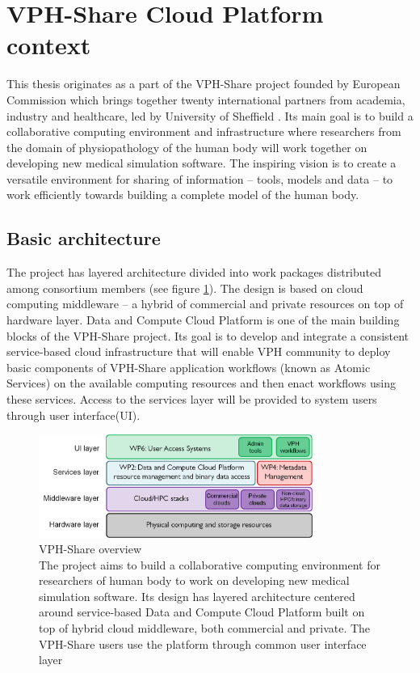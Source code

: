\section{VPH-Share Cloud Platform context}
This thesis originates as a part of the VPH-Share project founded by European Commission
which brings together twenty international partners from academia, industry and healthcare,
led by University of Sheffield \cite{vph-share-website}. Its main goal is to build a collaborative computing
environment and infrastructure where researchers from the domain of physiopathology of
the human body will work together on developing new medical simulation software. The inspiring
vision is to create a versatile environment for sharing of information -- tools, models and data
-- to work efficiently towards building a complete model of the human body.\\

\subsection{Basic architecture}
The project has layered architecture divided into work packages distributed among consortium
members (see figure \ref{fig:dri-high-level}). The design is based on cloud computing middleware
-- a hybrid of commercial and private resources on top of hardware layer. Data and Compute
Cloud Platform is one of the main building blocks of the VPH-Share project. Its goal is to
develop and integrate a consistent service-based cloud infrastructure that will enable VPH
community to deploy basic components of VPH-Share application workflows (known as Atomic Services)
on the available computing resources and then enact workflows using these services. Access to the
services layer will be provided to system users through user interface(UI).

\begin{figure}[h!]
	\centering
	\includegraphics[width=0.8\textwidth]{images/vph-high-level.png}
	\caption{VPH-Share overview\\
	The project aims to build a collaborative computing environment
	for researchers of human body to work on developing new medical simulation software.
	Its design has layered architecture centered around service-based Data and Compute
	Cloud Platform built on top of hybrid cloud middleware, both commercial and private. The VPH-Share
	users use the platform through common user interface layer \cite{vph-deliverable-2-2}}
	\label{fig:dri-high-level}
\end{figure} 



